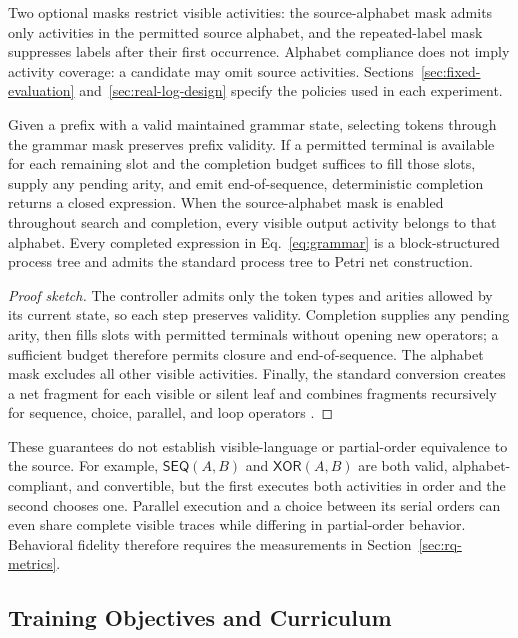 \documentclass[mathematics,article,submit,moreauthors]{Definitions/mdpi}
\begin{document}


Two optional masks restrict visible activities: the source-alphabet mask admits only activities in the permitted source alphabet, and the repeated-label mask suppresses labels after their first occurrence. Alphabet compliance does not imply activity coverage: a candidate may omit source activities. Sections~\ref{sec:fixed-evaluation} and~\ref{sec:real-log-design} specify the policies used in each experiment.

\begin{Proposition}
Given a prefix with a valid maintained grammar state, selecting tokens through the grammar mask preserves prefix validity. If a permitted terminal is available for each remaining slot and the completion budget suffices to fill those slots, supply any pending arity, and emit end-of-sequence, deterministic completion returns a closed expression. When the source-alphabet mask is enabled throughout search and completion, every visible output activity belongs to that alphabet. Every completed expression in Eq.~\eqref{eq:grammar} is a block-structured process tree and admits the standard process tree to Petri net construction.
\end{Proposition}
\begin{proof}[Proof sketch]
The controller admits only the token types and arities allowed by its current state, so each step preserves validity. Completion supplies any pending arity, then fills slots with permitted terminals without opening new operators; a sufficient budget therefore permits closure and end-of-sequence. The alphabet mask excludes all other visible activities. Finally, the standard conversion creates a net fragment for each visible or silent leaf and combines fragments recursively for sequence, choice, parallel, and loop operators \cite{vanDerAalst2016}.
\end{proof}

These guarantees do not establish visible-language or partial-order equivalence to the source. For example, $\mathsf{SEQ}(A,B)$ and $\mathsf{XOR}(A,B)$ are both valid, alphabet-compliant, and convertible, but the first executes both activities in order and the second chooses one. Parallel execution and a choice between its serial orders can even share complete visible traces while differing in partial-order behavior. Behavioral fidelity therefore requires the measurements in Section~\ref{sec:rq-metrics}.

\subsection{Training Objectives and Curriculum}\label{sec:training}
\end{document}
